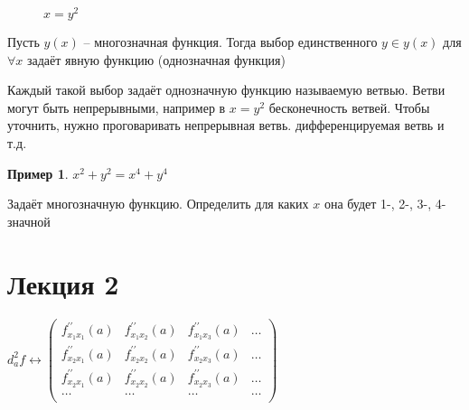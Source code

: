 \documentclass{book}
\newcommand{\pp}[1]{#1^{\prime\prime}}
\theoremstyle{definition}
\newtheorem*{example}{Пример}
\begin{document}
        \begin{figure}[!ht]
                \centering
                \caption{$x=y^2$}
                \label{$x=y^2$}
            \end{figure}

        Пусть $y(x)$ -- многозначная функция. Тогда выбор единственного  $y\in y(x)$ для  $\forall x$ задаёт явную функцию (однозначная функция)

        Каждый такой выбор задаёт однозначную функцию называемую ветвью. Ветви могут быть непрерывными, например в $x=y^2$ бесконечность ветвей. Чтобы уточнить, нужно проговаривать непрерывная ветвь. дифференцируемая ветвь и т.д.

        \begin{example}
            $x^2+y^2 = x^4 + y^4$

            Задаёт многозначную функцию. Определить для каких $x$ она будет 1-, 2-, 3-, 4-значной
        \end{example}


        \section{Лекция 2}
    
        $d^2_af \longleftrightarrow \begin{pmatrix} 
            \pp f_{x_1x_1}(a) & \pp f_{x_1x_2}(a) & \pp f_{x_1x_3}(a) & \ldots \\
            \pp f_{x_2x_1}(a) & \pp f_{x_2x_2}(a) & \pp f_{x_2x_3}(a) & \ldots \\
            \pp f_{x_2x_1}(a) & \pp f_{x_2x_2}(a) & \pp f_{x_2x_3}(a) & \ldots \\
            \ldots & \ldots & \ldots & \ldots \\
        \end{pmatrix} $ 
\end{document}
